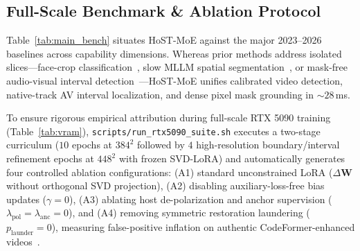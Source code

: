 \documentclass[10pt,twocolumn]{article}
\begin{document}
\begin{table}[t]
\centering
\caption{\textbf{Trainable Parameter \& RTX 5090 (32\,GB, BF16) Memory Budget} at $T=16$, $384\times 384$, micro-batch $B=4$.}
\label{tab:vram}
\vspace{-5pt}
\end{table}

\subsection{Full-Scale Benchmark \& Ablation Protocol}
\label{subsec:protocol}
Table~\ref{tab:main_bench} situates HoST-MoE against the major 2023--2026 baselines across capability dimensions. Whereas prior methods address isolated slices---face-crop classification~\cite{yan2025effort,moste2026}, slow MLLM spatial segmentation~\cite{kang2026manividlens}, or mask-free audio-visual interval detection~\cite{huang2026avfable}---HoST-MoE unifies calibrated video detection, native-track AV interval localization, and dense pixel mask grounding in ${\sim}28$\,ms.

To ensure rigorous empirical attribution during full-scale RTX 5090 training (Table~\ref{tab:vram}), \texttt{scripts/run\_rtx5090\_suite.sh} executes a two-stage curriculum ($10$ epochs at $384^2$ followed by $4$ high-resolution boundary/interval refinement epochs at $448^2$ with frozen SVD-LoRA) and automatically generates four controlled ablation configurations: (A1) standard unconstrained LoRA ($\Delta\mathbf{W}$ without orthogonal SVD projection), (A2) disabling auxiliary-loss-free bias updates ($\gamma=0$), (A3) ablating host de-polarization and anchor supervision ($\lambda_{\text{pol}}=\lambda_{\text{anc}}=0$), and (A4) removing symmetric restoration laundering ($p_{\text{launder}}=0$), measuring false-positive inflation on authentic CodeFormer-enhanced videos~\cite{zhou2022codeformer}.
\end{document}
